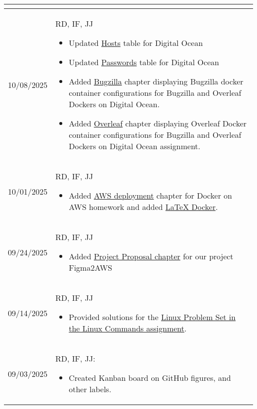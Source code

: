 \begin{longtable}{|l||p{13.5cm}|}
\begin{itemize}[topsep=0pt,itemsep=0pt,parsep=0pt,partopsep=0pt,leftmargin=12pt]
\end{itemize}
\\ \hline

10/08/2025 & RD, IF, JJ
\begin{itemize}[topsep=0pt,itemsep=0pt,parsep=0pt,partopsep=0pt,leftmargin=12pt]
    \item Updated \hyperref[Chapter::Hosts]{Hosts} table for Digital Ocean
    \item Updated \hyperref[Chapter::Passwords]{Passwords} table for Digital Ocean
    \item Added \hyperref[Chapter::Bugzilla]{Bugzilla} chapter displaying Bugzilla docker container configurations for Bugzilla and Overleaf Dockers on Digital Ocean.
    \item Added \hyperref[Chapter!Overleaf]{Overleaf} chapter displaying Overleaf Docker container configurations for Bugzilla and Overleaf Dockers on Digital Ocean assignment.

    \end{itemize}
\\ \hline

10/01/2025 & RD, IF, JJ
\begin{itemize}[topsep=0pt,itemsep=0pt,parsep=0pt,partopsep=0pt,leftmargin=12pt]
    \item Added \hyperref[Chapter::AWSDeployment]{AWS deployment} chapter for Docker on AWS homework and added \hyperref[Chapter::LaTeXDocker]{LaTeX Docker}.
\end{itemize}
\\ \hline

09/24/2025 & RD, IF, JJ
\begin{itemize}[topsep=0pt,itemsep=0pt,parsep=0pt,partopsep=0pt,leftmargin=12pt]
    \item Added \hyperref[chap:pproposal]{Project Proposal chapter} for our project Figma2AWS
\end{itemize}
\\ \hline

09/14/2025 & RD, IF, JJ
\begin{itemize}[topsep=0pt,itemsep=0pt,parsep=0pt,partopsep=0pt,leftmargin=12pt]
    \item Provided solutions for the \hyperref[chap:linux]{Linux Problem Set in the Linux Commands assignment}.
\end{itemize}
\\ \hline

09/03/2025 & RD, IF, JJ:
\begin{itemize}[topsep=0pt,itemsep=0pt,parsep=0pt,partopsep=0pt,leftmargin=12pt]
\item Created Kanban board on GitHub 
figures, and other labels.
\end{itemize} 
\\ \hline





\end{longtable}


